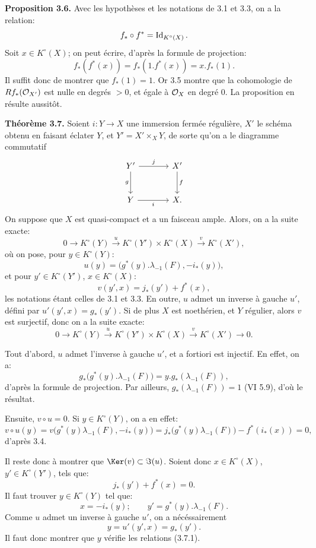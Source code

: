 \textbf{Proposition 3.6.} Avec les hypothèses et les notations de 3.1 et 3.3, on a la relation:
\[
f_*\circ f^*=\operatorname{Id}_{K^\circ(X)}.
\]
Soit \(x\in K^\circ(X)\); on peut écrire, d'après la formule de projection:
\[
f_*(f^*(x))=f_*(1.f^*(x))=x.f_*(1).
\]
Il suffit donc de montrer que \(f_*(1)=1\). Or 3.5 montre que la cohomologie de \(Rf_*(\mathcal O_{X'})\) est nulle en degrés \(>0\), et égale à \(\mathcal O_X\) en degré \(0\). La proposition en résulte aussitôt.

\textbf{Théorème 3.7.} Soient \(i:Y\to X\) une immersion fermée régulière, \(X'\) le schéma obtenu en faisant éclater \(Y\), et \(Y'=X'\times_XY\), de sorte qu'on a le diagramme commutatif
\[
\begin{tikzcd}[column sep=large,row sep=large]
Y' \arrow[r,"j"] \arrow[d,"g"'] & X' \arrow[d,"f"]\\
Y \arrow[r,"i"'] & X.
\end{tikzcd}
\]
On
suppose que \(X\) est quasi-compact et a un faisceau ample. Alors, on a la suite exacte:
\[
0\longrightarrow K^\circ(Y)\xrightarrow{u}K^\circ(Y')\times K^\circ(X)
\xrightarrow{v}K^\circ(X'),
\]
où on pose, pour \(y\in K^\circ(Y)\):
\[
u(y)=\bigl(g^*(y).\lambda_{-1}(F),-i_*(y)\bigr),
\]
et pour \(y'\in K^\circ(Y')\), \(x\in K^\circ(X)\):
\[
v(y',x)=j_*(y')+f^*(x),
\]
les notations étant celles de 3.1 et 3.3. En outre, \(u\) admet un inverse à gauche \(u'\), défini par \(u'(y',x)=g_*(y')\).
Si de plus \(X\) est noethérien, et \(Y\) régulier, alors \(v\) est surjectif, donc on a la suite exacte:
\[
0\longrightarrow K^\circ(Y)\xrightarrow{u}K^\circ(Y')\times K^\circ(X)
\xrightarrow{v}K^\circ(X')\longrightarrow0.
\]

Tout d'abord, \(u\) admet l'inverse à gauche \(u'\), et a fortiori est injectif. En effet, on a:
\[
g_*\bigl(g^*(y).\lambda_{-1}(F)\bigr)
=y.g_*(\lambda_{-1}(F)),
\]
d'après la formule de projection. Par ailleurs, \(g_*(\lambda_{-1}(F))=1\) (VI 5.9), d'où le résultat.

Ensuite, \(v\circ u=0\). Si \(y\in K^\circ(Y)\), on a en effet:
\[
v\circ u(y)
=v\bigl(g^*(y)\lambda_{-1}(F),-i_*(y)\bigr)
=j_*\bigl(g^*(y)\lambda_{-1}(F)\bigr)-f^*(i_*(x))=0,
\]
d'après 3.4.

Il reste donc à montrer que \(\Ker(v)\subset \Im(u)\). Soient donc \(x\in K^\circ(X)\), \(y'\in K^\circ(Y')\), tels que:
\[
j_*(y')+f^*(x)=0.
\]
Il
faut trouver \(y\in K^\circ(Y)\) tel que:
\begin{equation}\tag{3.7.1}
x=-i_*(y);\qquad y'=g^*(y).\lambda_{-1}(F).
\end{equation}
Comme \(u\) admet un inverse à gauche \(u'\), on a nécéssairement
\[
y=u'(y',x)=g_*(y').
\]
Il faut donc montrer que \(y\) vérifie les relations (3.7.1).

